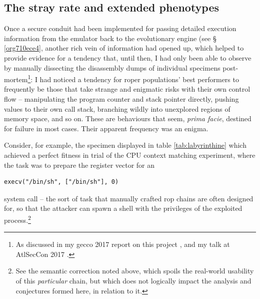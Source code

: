 \documentclass[12pt,glossary]{dalthesis}
\begin{document}
\subsection{The stray rate and extended phenotypes}
\label{sec:orgd82c718}
\label{org6c8128f}

Once a secure conduit had been implemented for passing detailed execution
information from the emulator back to the evolutionary engine (see \S
\ref{org710ece4},
another rich vein of information had opened up, which helped to provide evidence for a
tendency that, until then, I had only been able to observe by manually
dissecting the disassembly dumps of individual specimens post-mortem\footnote{As discussed in my \gls{gecco} 2017 report on this project \cite{fraser17_gecco},
  and my talk at AtlSecCon 2017 \cite{fraser17_atlseccon}.}: I had noticed a tendency for \gls{roper} populations' best
performers to frequently be those that take strange and enigmatic risks with their own
control flow -- manipulating the program counter and stack pointer directly,
pushing values to their own call stack, branching wildly into unexplored regions
of memory space, and so on. These are behaviours that seem, \emph{prima facie}, destined
for failure in most cases. Their apparent frequency was an enigma. 

Consider, for example, the specimen displayed in 
table \ref{tab:labyrinthine} which
achieved a perfect fitness in trial of the CPU context matching experiment,
where the task was to prepare the register vector for an
\begin{verbatim}
execv("/bin/sh", ["/bin/sh"], 0)
\end{verbatim}
system call -- the sort of task that manually crafted \gls{rop} chains are often
designed for, so that the attacker can spawn a shell with the privileges of the
exploited process.\footnote{See the semantic correction noted above, which 
  spoils the real-world usability of this \emph{particular} chain, but which
  does not logically impact the analysis and conjectures formed here,
  in relation to it.}
\end{document}
